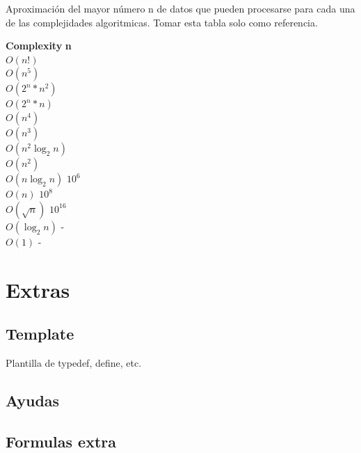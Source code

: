 \documentclass[10pt,landscape,twocolumn,a4paper,notitlepage]{article}
\newcommand\cppfile[2][]{

}
\begin{document}
Aproximación del mayor número n de datos que pueden procesarse para cada una de las complejidades algoritmicas. Tomar esta tabla solo como referencia.

\begin{tabbing}
\textbf{Complexity}\hspace{4cm} \=  \textbf{n}\hspace{3cm}   \\ 
$O(n!)$ \\ 
$O(n^{5})$ \\ 
$O(2^{n}*n^{2})$ \\ 
$O(2^{n}*n)$ \\ 
$O(n^{4})$ \\ 
$O(n^{3})$ \\ 
$O(n^{2}\log_{2}n)$ \\ 
$O(n^{2})$ \\ 
$O(n\log_{2}n)$ \> $10^{6}$\\ 
$O(n)$ \> $10^{8}$\\ 
$O(\sqrt{n})$ \> $10^{16}$\\ 
$O(\log_{2}n)$ \> -\\ 
$O(1)$ \> -\\ 
\end{tabbing}




	\section{Extras}
		\subsection{Template}
			Plantilla de typedef, define, etc.
			\cppfile[1-29]{otros/template.cpp}
		
		\subsection{Ayudas}
			\cppfile[34-50]{otros/template.cpp}
		
		\subsection{Formulas extra}
			
\end{document}
